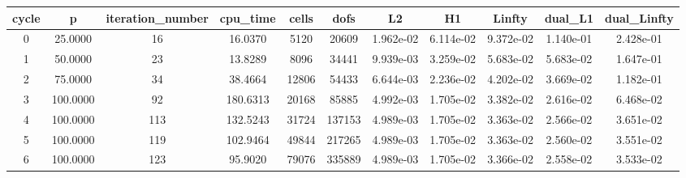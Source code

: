 \documentclass[10pt]{report}
\begin{document}
\begin{table}[H]
\begin{center}
\begin{tabular}{|c|c|c|c|c|c|c|c|c|c|c|} \hline
cycle & p & iteration_number & cpu_time & cells & dofs & L2 & H1 & Linfty & dual_L1 & dual_Linfty\\ \hline
0 & 25.0000 & 16 & 16.0370 & 5120 & 20609 & 1.962e-02 & 6.114e-02 & 9.372e-02 & 1.140e-01 & 2.428e-01\\ \hline
1 & 50.0000 & 23 & 13.8289 & 8096 & 34441 & 9.939e-03 & 3.259e-02 & 5.683e-02 & 5.683e-02 & 1.647e-01\\ \hline
2 & 75.0000 & 34 & 38.4664 & 12806 & 54433 & 6.644e-03 & 2.236e-02 & 4.202e-02 & 3.669e-02 & 1.182e-01\\ \hline
3 & 100.0000 & 92 & 180.6313 & 20168 & 85885 & 4.992e-03 & 1.705e-02 & 3.382e-02 & 2.616e-02 & 6.468e-02\\ \hline
4 & 100.0000 & 113 & 132.5243 & 31724 & 137153 & 4.989e-03 & 1.705e-02 & 3.363e-02 & 2.566e-02 & 3.651e-02\\ \hline
5 & 100.0000 & 119 & 102.9464 & 49844 & 217265 & 4.989e-03 & 1.705e-02 & 3.363e-02 & 2.560e-02 & 3.551e-02\\ \hline
6 & 100.0000 & 123 & 95.9020 & 79076 & 335889 & 4.989e-03 & 1.705e-02 & 3.366e-02 & 2.558e-02 & 3.533e-02\\ \hline
\end{tabular}
\end{center}
\end{table}
\end{document}

